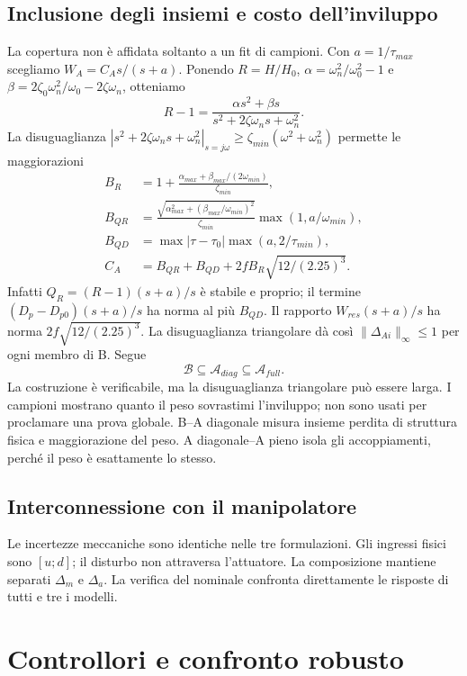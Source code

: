\section{Inclusione degli insiemi e costo dell'inviluppo}
La copertura non è affidata soltanto a un fit di campioni. Con
$a=1/\tau_{max}$ scegliamo $W_A=C_A s/(s+a)$. Ponendo
$R=H/H_0$, $\alpha=\omega_n^2/\omega_0^2-1$ e
$\beta=2\zeta_0\omega_n^2/\omega_0-2\zeta\omega_n$, otteniamo
\[
R-1=\frac{\alpha s^2+\beta s}{s^2+2\zeta\omega_ns+\omega_n^2}.
\]
La disuguaglianza
$|s^2+2\zeta\omega_ns+\omega_n^2|_{s=j\omega}
\ge\zeta_{min}(\omega^2+\omega_n^2)$ permette le maggiorazioni
\begin{align*}
B_R&=1+\frac{\alpha_{max}+\beta_{max}/(2\omega_{min})}{\zeta_{min}},\\
B_{QR}&=\frac{\sqrt{\alpha_{max}^2+(\beta_{max}/\omega_{min})^2}}{\zeta_{min}}
\max(1,a/\omega_{min}),\\
B_{QD}&=\max|\tau-\tau_0|\max(a,2/\tau_{min}),\\
C_A&=B_{QR}+B_{QD}+2fB_R\sqrt{12/(2.25)^3}.
\end{align*}
Infatti $Q_R=(R-1)(s+a)/s$ è stabile e proprio; il termine
$(D_p-D_{p0})(s+a)/s$ ha norma al più $B_{QD}$.
Il rapporto $W_{res}(s+a)/s$ ha norma $2f\sqrt{12/(2.25)^3}$.
La disuguaglianza triangolare dà così $\|\Delta_{Ai}\|_\infty\le1$
per ogni membro di B. Segue
\[
\mathcal B\subseteq\mathcal A_{diag}\subseteq\mathcal A_{full}.
\]
La costruzione è verificabile, ma la disuguaglianza triangolare può essere
larga. I campioni mostrano quanto il peso sovrastimi l'inviluppo; non sono
usati per proclamare una prova globale. B--A diagonale misura insieme
perdita di struttura fisica e maggiorazione del peso. A diagonale--A pieno
isola gli accoppiamenti, perché il peso è esattamente lo stesso.
\section{Interconnessione con il manipolatore}
Le incertezze meccaniche sono identiche nelle tre formulazioni. Gli ingressi
fisici sono $[u;d]$; il disturbo non attraversa l'attuatore. La composizione
mantiene separati $\Delta_m$ e $\Delta_a$. La verifica del nominale confronta
direttamente le risposte di tutti e tre i modelli.

\chapter{Controllori e confronto robusto}
